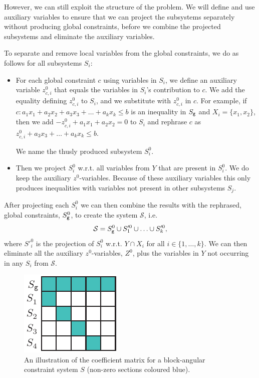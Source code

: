 However, we can still exploit the structure of the problem. We will define and use auxiliary variables to ensure that we can project the subsystems separately without producing global constraints, before we combine the projected  subsystems and eliminate the auxiliary variables.
 
To separate and remove local variables from the global constraints, we do as follows for all subsystems $S_i$:
\begin{itemize}\itemsep0em
\item For each global constraint $c$ using variables in $S_i$, we define an auxiliary variable $z^0_{c,i}$ that equals the variables in $S_i$'s contribution to $c$. We add the equality defining $z^0_{c,i}$ to $S_i$, and we substitute with $z^0_{c,i}$ in $c$. For example, if $c: a_1x_1 + a_2x_2 + a_3x_3 + \ldots + a_kx_k \leq b$ is an inequality in $S_{\texttt{g}}$ and $X_i = \{x_1,x_2\}$, then we add $-z^0_{c,i} + a_1x_1 + a_2x_2 = 0$ to $S_i$ and rephrase $c$ as $z^0_{c,i} + a_3x_3 + \ldots + a_kx_k \leq b$. 

We name the thusly produced subsystem $S_i^0$. 
\item Then we project $S_i^0$ w.r.t. all variables from $Y$ that are present in $S_i^0$. We do keep the auxiliary $z^0$-variables. 
Because of these auxiliary variables this only produces inequalities with variables not present in other subsystems $S_j$. 
\end{itemize}
After projecting each $S_i^0$ we can then combine the results with the rephrased, global constraints, $S_{\texttt{g}}^0$, to create the system $\mathcal{S}$, i.e. 
\begin{equation}\label{eq:curlyS}
\mathcal{S} = S^0_{\texttt{g}} \cup S'^0_1\cup \ldots \cup S'^0_k,
\end{equation}
where $S'^0_i$ is the projection of $S^0_i$ w.r.t. $Y\cap X_i$ for all $i\in\{1,\ldots, k\}$.
We can then eliminate all the auxiliary $z^0$-variables, $Z^0$, plus the variables in $Y$ not occurring in any $S_i$ from $\mathcal{S}$. %

\begin{figure}[htbp]
	\centering
		\includegraphics{figures/blockStructure.pdf}
	\caption{An illustration of the coefficient matrix for a block-angular constraint system $S$ (non-zero sections coloured blue).}
	\label{fig:decomp}
\end{figure}


